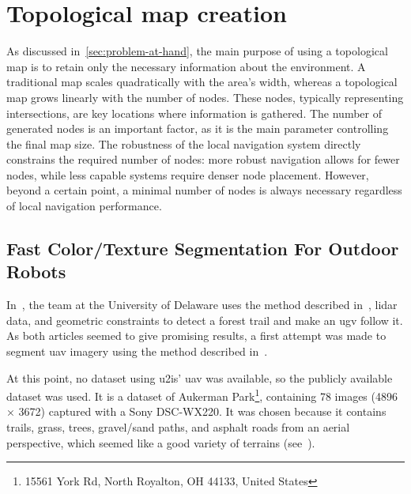 \chapter{Topological map creation}\label{ch:topological-map-creation}

As discussed in~\ref{sec:problem-at-hand}, the main purpose of using a topological map is to retain only the necessary information about the environment.
A traditional map scales quadratically with the area’s width, whereas a topological map grows linearly with the number of nodes.
These nodes, typically representing intersections, are key locations where information is gathered.
The number of generated nodes is an important factor, as it is the main parameter controlling the final map size.
The robustness of the local navigation system directly constrains the required number of nodes: more robust navigation
allows for fewer nodes, while less capable systems require denser node placement.
However, beyond a certain point, a minimal number of nodes is always necessary regardless of local navigation performance.


\section{Fast Color/Texture Segmentation For Outdoor Robots}

In~\textcite{rasmussen_appearance_2009}, the team at the University of Delaware uses the method described in~\textcite{rufus_blas_fast_2008},
\gls{lidar} data, and geometric constraints to detect a forest trail and make an \gls{ugv} follow it.\\
As both articles seemed to give promising results, a first attempt was made to segment \gls{uav} imagery using the method
described in~\textcite{rufus_blas_fast_2008}.

At this point, no dataset using \gls{u2is}' \gls{uav} was available, so the publicly available~\textcite{noauthor_aukerman_nodate} dataset was used.
It is a dataset of Aukerman Park\footnote{15561 York Rd, North Royalton, OH 44133, United States}, containing 78 images
(4896 × 3672) captured with a Sony DSC-WX220.
It was chosen because it contains trails, grass, trees, gravel/sand paths, and asphalt roads from an aerial perspective,
which seemed like a good variety of terrains (see~).


